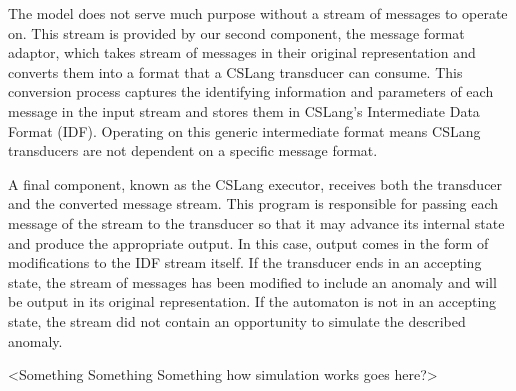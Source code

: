 The model does not serve much purpose without a stream of messages to
operate on.
This stream is provided by our second component,
the message format adaptor,
which takes
stream of messages in their original representation and converts
them into a format that a CSLang transducer can consume. This conversion process
captures the identifying information and parameters of each message in the
input stream and stores them in CSLang's Intermediate Data Format (IDF).
Operating on this generic intermediate format means CSLang transducers are
not dependent on a specific message format.


A final component, known as the CSLang executor,
receives both the transducer and the converted message stream.
This program is responsible for passing each message of the stream
to the transducer
so that it may advance its internal state and
produce the appropriate output.
In this case, output comes in the form of modifications to the IDF stream itself.
If the transducer
ends in an accepting state, the stream of messages has
been modified to include an anomaly and will be output in its original
representation.  If the automaton is not in an accepting state, the stream
did not contain an opportunity to simulate the described anomaly.

<Something Something Something how simulation works goes here?>


